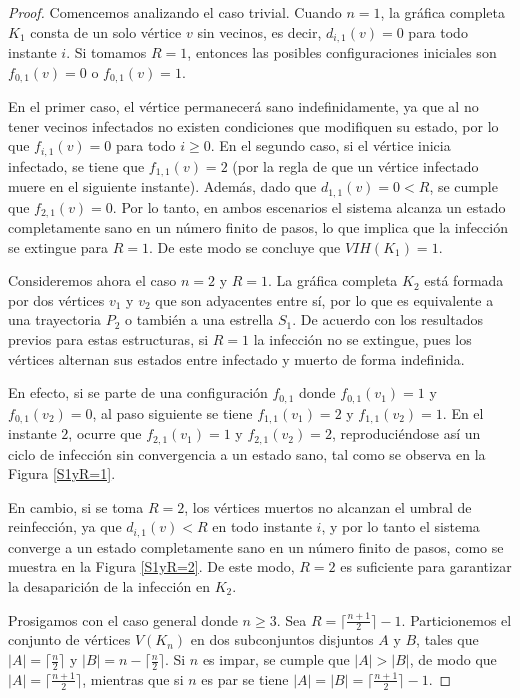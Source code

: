 \documentclass[12pt,titlepage,twoside,openright]{book}
\begin{document}
\begin{proof}

    Comencemos analizando el caso trivial. Cuando $n=1$, la gr\'afica completa $K_1$ consta de un solo v\'ertice $v$ sin vecinos, es decir, $d_{i,1}(v)=0$ para todo instante $i$. Si tomamos $R=1$, entonces las posibles configuraciones iniciales son $f_{0,1}(v)=0$ o $f_{0,1}(v)=1$. 
    
    En el primer caso, el v\'ertice permanecer\'a sano indefinidamente, ya que al no tener vecinos infectados no existen condiciones que modifiquen su estado, por lo que $f_{i,1}(v)=0$ para todo $i\geq 0$. En el segundo caso, si el v\'ertice inicia infectado, se tiene que $f_{1,1}(v)=2$ (por la regla de que un v\'ertice infectado muere en el siguiente instante). Adem\'as, dado que $d_{1,1}(v)=0<R$, se cumple que $f_{2,1}(v)=0$. Por lo tanto, en ambos escenarios el sistema alcanza un estado completamente sano en un n\'umero finito de pasos, lo que implica que la infecci\'on se extingue para $R=1$. De este modo se concluye que $VIH(K_1)=1$.

    Consideremos ahora el caso $n=2$ y $R=1$. La gr\'afica completa $K_2$ est\'a formada por dos v\'ertices $v_1$ y $v_2$ que son adyacentes entre s\'i, por lo que es equivalente a una trayectoria $P_2$ o tambi\'en a una estrella $S_1$. De acuerdo con los resultados previos para estas estructuras, si $R=1$ la infecci\'on no se extingue, pues los v\'ertices alternan sus estados entre infectado y muerto de forma indefinida. 
    
    En efecto, si se parte de una configuraci\'on $f_{0,1}$ donde $f_{0,1}(v_1)=1$ y $f_{0,1}(v_2)=0$, al paso siguiente se tiene $f_{1,1}(v_1)=2$ y $f_{1,1}(v_2)=1$. En el instante $2$, ocurre que $f_{2,1}(v_1)=1$ y $f_{2,1}(v_2)=2$, reproduci\'endose as\'i un ciclo de infecci\'on sin convergencia a un estado sano, tal como se observa en la Figura \ref{S1yR=1}. 
    
    En cambio, si se toma $R=2$, los v\'ertices muertos no alcanzan el umbral de reinfecci\'on, ya que $d_{i,1}(v)<R$ en todo instante $i$, y por lo tanto el sistema converge a un estado completamente sano en un n\'umero finito de pasos, como se muestra en la Figura \ref{S1yR=2}. De este modo, $R=2$ es suficiente para garantizar la desaparici\'on de la infecci\'on en $K_2$.

    Prosigamos con el caso general donde $n\geq 3$. Sea $R=\lceil \tfrac{n+1}{2}\rceil-1$. Particionemos el conjunto de v\'ertices $V(K_n)$ en dos subconjuntos disjuntos $A$ y $B$, tales que $|A|=\lceil \tfrac{n}{2}\rceil$ y $|B|=n-\lceil \tfrac{n}{2}\rceil$. Si $n$ es impar, se cumple que $|A|>|B|$, de modo que $|A|=\lceil \tfrac{n+1}{2}\rceil$, mientras que si $n$ es par se tiene $|A|=|B|=\lceil \tfrac{n+1}{2}\rceil-1$.
    

\end{proof}
\end{document}
